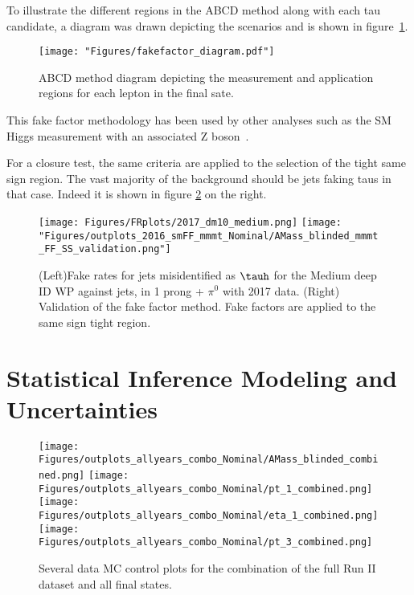To illustrate the different regions in the ABCD method along with each tau candidate, a diagram was drawn depicting the scenarios and is shown in figure~\ref{fig:fakefactor_reg}. 
\begin{figure}[ht!b]
\label{fig:fakefactor_reg}
  \texttt{[image: "Figures/fakefactor\_diagram.pdf"]}
    \caption{ ABCD method diagram depicting the measurement and application regions for each \tauh lepton in the final sate.}
\end{figure}

This fake factor methodology has been used by other analyses such as the SM Higgs measurement with an associated Z boson~\cite{CMS-PAS-HIG-19-010}. 

For a closure test, the same criteria are applied to the selection of the tight same sign region. The vast majority of the background should be jets faking taus in that case. Indeed it is shown in figure \ref{fig:fakefactor_validation} on the right.

\begin{figure}[ht!b]
\centering
\texttt{[image: Figures/FRplots/2017\_dm10\_medium.png]}
\texttt{[image: "Figures/outplots\_2016\_smFF\_mmmt\_Nominal/AMass\_blinded\_mmmt\_FF\_SS\_validation.png"]}
\caption{\label{fig:fakefactor_validation} 
(Left)Fake rates for jets misidentified as $\tauh$ for the Medium deep ID WP against jets, in 1 prong + $\pi^0$ with 2017 data.
(Right) Validation of the fake factor method. Fake factors are applied to the same sign tight region.}
\end{figure}

  

\section{Statistical Inference Modeling and Uncertainties}

\begin{figure}[ht!b]
  \centering
  \texttt{[image: Figures/outplots\_allyears\_combo\_Nominal/AMass\_blinded\_combined.png]}
  \texttt{[image: Figures/outplots\_allyears\_combo\_Nominal/pt\_1\_combined.png]}\\
  \texttt{[image: Figures/outplots\_allyears\_combo\_Nominal/eta\_1\_combined.png]}
  \texttt{[image: Figures/outplots\_allyears\_combo\_Nominal/pt\_3\_combined.png]}\\
    \caption{\label{fig:AMass_RunII}  Several data MC control plots for the combination of the full Run II dataset and all final states.}
\end{figure}


